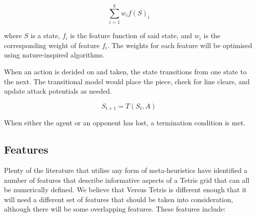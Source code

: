 \documentclass[a4paper, 12pt]{extreport}
\begin{document}
	\begin{equation}\label{eq:heuristic}
		\sum_{i=1}^{k} w_i f(S)_i
	\end{equation}
	
	\noindent where $S$ is a state, $f_i$ is the feature function of said state, and $w_i$ is the corresponding weight of feature $f_i$. The weights for each feature will be optimised using nature-inspired algorithms.
	
	When an action is decided on and taken, the state transitions from one state to the next. The transitional model would place the piece, check for line clears, and update attack potentials as needed.
	
	\begin{equation}
		S_{t+1} = T(S_t, A)
	\end{equation}
	
	When either the agent or an opponent has lost, a termination condition is met.
	
	\subsection{Features}\label{subsec:features}
	
	Plenty of the literature that utilise any form of meta-heuristics have identified a number of features that describe informative aspects of a Tetris grid that can all be numerically defined. We believe that Versus Tetris is different enough that it will need a different set of features that should be taken into consideration, although there will be some overlapping features. These features include:
	
\end{document}

